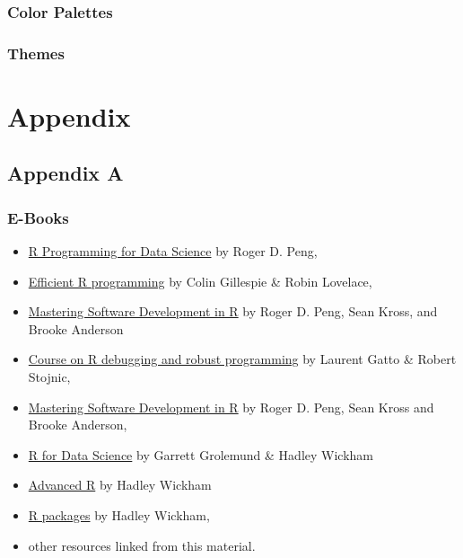 \documentclass[]{book}
\providecommand{\tightlist}{%
  \setlength{\itemsep}{0pt}\setlength{\parskip}{0pt}}
\theoremstyle{definition}
\theoremstyle{definition}
\theoremstyle{definition}
\theoremstyle{remark}
\begin{document}
\hypertarget{color-palettes}{%
\section{Color Palettes}\label{color-palettes}}

\hypertarget{themes-1}{%
\section{Themes}\label{themes-1}}

\hypertarget{part-appendix}{%
\part{Appendix}\label{part-appendix}}

\hypertarget{appendix-resources}{%
\chapter{Appendix A}\label{appendix-resources}}

\hypertarget{e-books}{%
\section{E-Books}\label{e-books}}

\begin{itemize}
\tightlist
\item
  \href{https://bookdown.org/rdpeng/rprogdatascience/}{R Programming for
  Data Science} by Roger D. Peng,
\item
  \href{https://bookdown.org/csgillespie/efficientR/}{Efficient R
  programming} by Colin Gillespie \& Robin Lovelace,
\item
  \href{https://bookdown.org/rdpeng/RProgDA/}{Mastering Software
  Development in R} by Roger D. Peng, Sean Kross, and Brooke Anderson
\item
  \href{https://github.com/lgatto/2016-02-25-adv-programming-EMBL}{Course
  on R debugging and robust programming} by Laurent Gatto \& Robert
  Stojnic,
\item
  \href{https://bookdown.org/rdpeng/RProgDA/}{Mastering Software
  Development in R} by Roger D. Peng, Sean Kross and Brooke Anderson,
\item
  \href{http://r4ds.had.co.nz/index.html}{R for Data Science} by Garrett
  Grolemund \& Hadley Wickham
\item
  \href{http://adv-r.had.co.nz/}{Advanced R} by Hadley Wickham
\item
  \href{http://r-pkgs.had.co.nz/}{R packages} by Hadley Wickham,
\item
  other resources linked from this material.
\end{itemize}


\end{document}

